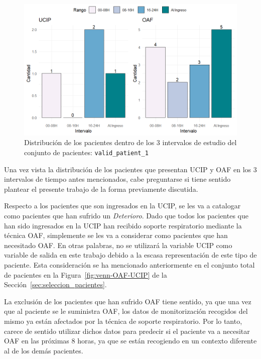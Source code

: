\begin{figure}[H]
    \centering
    \includegraphics[scale = 0.9]{./img/intervalos-valid-1.png}
    \caption{Distribución de los pacientes dentro de los $3$ intervalos de estudio del conjunto de pacientes: \texttt{valid\_patient\_1}}
    \label{fig:intervalos-valid-1}
\end{figure}

Una vez vista la distribución de los pacientes que presentan UCIP y OAF en los $3$ intervalos de tiempo antes mencionados, cabe preguntarse si tiene sentido plantear el presente trabajo de la forma previamente discutida.

Respecto a los pacientes que son ingresados en la UCIP, se les va a catalogar como pacientes que han sufrido un \textit{Deterioro}. Dado que todos los pacientes que han sido ingresados en la UCIP han recibido soporte respiratorio mediante la técnica OAF, simplemente se les va a considerar como pacientes que han necesitado OAF. En otras palabras, no se utilizará la variable UCIP como variable de salida en este trabajo debido a la escasa representación de este tipo de paciente. Esta consideración se ha mencionado anteriormente en el conjunto total de pacientes en la Figura~\ref{fig:venn-OAF-UCIP} de la Sección~\ref{sec:seleccion_pacientes}.

La exclusión de los pacientes que han sufrido OAF tiene sentido, ya que una vez que al paciente se le suministra OAF, los datos de monitorización recogidos del mismo ya están afectados por la técnica de soporte respiratorio. Por lo tanto, carece de sentido utilizar dichos datos para predecir si el paciente va a necesitar OAF en las próximas $8$ horas, ya que se están recogiendo en un contexto diferente al de los demás pacientes.

